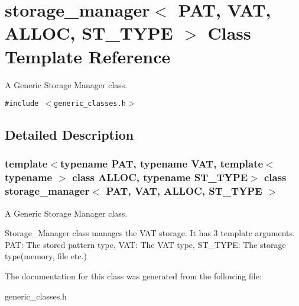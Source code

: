 \section{storage\_\-manager$<$ PAT, VAT, ALLOC, ST\_\-TYPE $>$ Class Template Reference}
\label{classstorage__manager}
A Generic Storage Manager class.  


{\tt \#include $<$generic\_\-classes.h$>$}



\subsection{Detailed Description}
\subsubsection*{template$<$typename PAT, typename VAT, template$<$ typename $>$ class ALLOC, typename ST\_\-TYPE$>$ class storage\_\-manager$<$ PAT, VAT, ALLOC, ST\_\-TYPE $>$}

A Generic Storage Manager class. 

Storage\_\-Manager class manages the VAT storage. It has 3 template arguments. PAT: The stored pattern type, VAT: The VAT type, ST\_\-TYPE: The storage type(memory, file etc.) 



The documentation for this class was generated from the following file:\begin{CompactItemize}
\item 
generic\_\-classes.h\end{CompactItemize}
